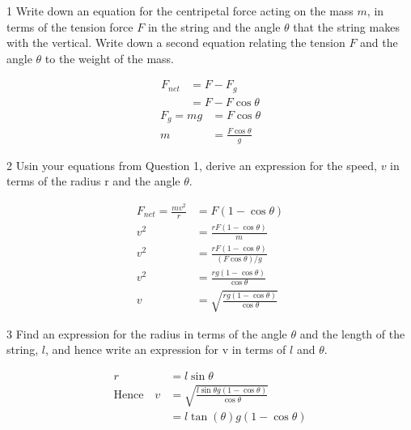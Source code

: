 \documentclass{article}
\newenvironment{problem}[1]{\begin{prob*}{#1}{}}{\end{prob*}}
\begin{document}
\begin{problem}{1}
Write down an equation for the centripetal force acting on the mass $m$, in terms of the tension force $F$ in the string and the angle $\theta$ that the string makes with the vertical. Write down a second equation relating the tension $F$ and the angle $\theta$ to the weight of the mass.
\end{problem}
\begin{align}
F_{net} &= F - F_g \\
        &= F - F \cos \theta
\end{align}
\begin{align}
F_g = mg &= F \cos \theta \\
m &= \frac{F \cos \theta}{g}
\end{align}

\begin{problem}{2}
Usin your equations from Question 1, derive an expression for the speed, $v$
in terms of the radius r and the angle $\theta$.
\end{problem}

\begin{align}
F_{net} = \frac{m v^2}{r} &= F(1 - \cos \theta) \\
v^2 &= \frac{r F (1 - \cos \theta)}{m} \\
v^2 &= \frac{r F (1 - \cos \theta)}{(F \cos \theta) / g} \\
v^2 &= \frac{r g (1 - \cos \theta)}{\cos \theta} \\
v &= \sqrt{\frac{r g (1 - \cos \theta)}{\cos \theta}}
\end{align}

\begin{problem}{3}
Find an expression for the radius in terms of the angle $\theta$ and the length of the string, $l$, and hence write an expression for v in terms of $l$ and $\theta$.
\end{problem}

\begin{align}
r &= l \sin \theta \\
\text{Hence} \quad v &= \sqrt{\frac{l \sin \theta g (1 - \cos \theta)}{\cos \theta}} \\
&= l \tan (\theta) g (1 - \cos \theta)
\end{align}

\end{document}
